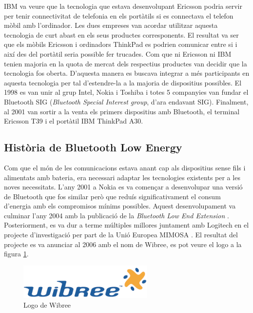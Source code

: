 IBM va veure que la tecnologia que estava desenvolupant Ericsson podria servir per tenir connectivitat de telefonia en els portàtils si es connectava el telefon mòbil amb l'ordinador.
Les dues empreses van acordar utilitzar aquesta tecnologia de curt abast en els seus productes corresponents.
El resultat va ser que els mòbils Ericsson i ordinadors ThinkPad es podrien comunicar entre si i així des del portàtil seria possible fer trucades.
Com que ni Ericsson ni IBM tenien majoria en la quota de mercat dels respectius productes van decidir que la tecnologia fos oberta.
D'aquesta manera es buscava integrar a més participants en aquesta tecnologia per tal d'estendre-la a la majoria de dispositius possibles.
El 1998 es van unir al grup Intel, Nokia i Toshiba i totes 5 companyies  van fundar el Bluetooth SIG (\textit{Bluetooth Special Interest group}, d'ara endavant SIG).
Finalment, al 2001 van sortir a la venta els primers dispositius amb Bluetooth, el terminal Ericsson T39 i el portàtil IBM ThinkPad A30.

\subsection{Història de Bluetooth Low Energy}
Com que el món de les comunicacions estava anant cap als dispositius sense fils i alimentats amb bateria, era necessari adaptar les tecnologies existents per a les noves necessitats.
L'any 2001 a Nokia es va començar a desenvolupar una versió de Bluetooth que fos similar però que reduís significativament el consum d'energia amb els compromisos mínims possibles.
Aquest desenvolupament va culminar l'any 2004 amb la publicació de la \textit{Bluetooth Low End Extension} \cite{Original_BLE_Extension}. 
Posteriorment, es va dur a terme múltiples millores juntament amb Logitech en el projecte d'investigació per part de la Unió Europea MIMOSA \cite{MIMOSA}.
El resultat del projecte es va anunciar al 2006 amb el nom de Wibree, es pot veure el logo a la figura \ref{wibree_logo}.

\begin{figure}[hb]
	\begin{center}
		\includegraphics[width=0.6\textwidth]{./images/Wibree_Logo.png}
		\caption{Logo de Wibree}
		\label{wibree_logo}
	\end{center}
\end{figure}

